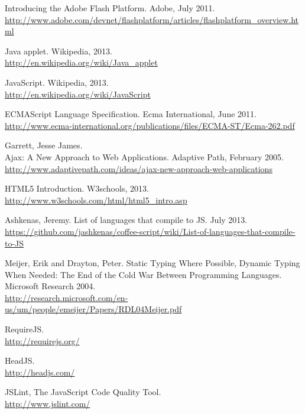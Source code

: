 \begin{thebibliography}{99}

	Introducing the Adobe Flash Platform. Adobe, July 2011.\\
	\url{http://www.adobe.com/devnet/flashplatform/articles/flashplatform\_overview.html}
	
	Java applet. Wikipedia, 2013.\\
	\url{http://en.wikipedia.org/wiki/Java\_applet}
	
	JavaScript. Wikipedia, 2013.\\
	\url{http://en.wikipedia.org/wiki/JavaScript}
	
	ECMAScript Language Specification. Ecma International, June 2011.\\
	\url{http://www.ecma-international.org/publications/files/ECMA-ST/Ecma-262.pdf}
	
	{\sc Garrett,} Jesse James.\\ Ajax: A New Approach to Web Applications. Adaptive Path, February 2005.\\
	\url{http://www.adaptivepath.com/ideas/ajax-new-approach-web-applications}

	HTML5 Introduction. W3schools, 2013.\\
	\url{http://www.w3schools.com/html/html5\_intro.asp}

  {\sc Ashkenas,} Jeremy. List of languages that compile to JS. July 2013.\\
  \url{https://github.com/jashkenas/coffee-script/wiki/List-of-languages-that-compile-to-JS}
	
	{\sc Meijer,} Erik and {\sc Drayton,} Peter. Static Typing Where Possible, Dynamic Typing When Needed: The End of the Cold War Between Programming Languages. Microsoft Research 2004.\\
	\url{http://research.microsoft.com/en-us/um/people/emeijer/Papers/RDL04Meijer.pdf}
	
	RequireJS.\\
	\url{http://requirejs.org/}
	
	HeadJS.\\
	\url{http://headjs.com/}
	
	JSLint, The JavaScript Code Quality Tool.\\
	\url{http://www.jslint.com/}
	

\end{thebibliography}
